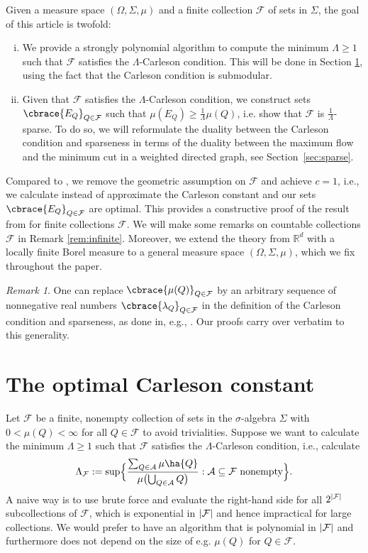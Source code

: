\documentclass[a4paper, oneside,11pt]{amsart}
\theoremstyle{definition}
\theoremstyle{remark}
\newtheorem{remark}[theorem]{Remark}
\numberwithin{equation}{section}
\newcommand{\R}{\ensuremath{\mathbb{R}}}
\newcommand{\mc}{\mathcal}
\DeclarePairedDelimiter\abs{\lvert}{\rvert}
\DeclarePairedDelimiter\cbrace\{\}
\DeclarePairedDelimiter\ha()
\newcommand{\hab}[1]{\bigl(#1\bigr)}
\newcommand{\cbraces}[1]{\Bigl\{#1\Bigr\}}
\begin{document}
\bigskip

Given a measure space $(\Omega,\Sigma,\mu)$ and a finite collection $\mc{F}$ of sets in $\Sigma$, the goal of this article is twofold:
\begin{enumerate}[(i)]
  \item \label{it:goal1}  We provide a strongly polynomial algorithm to compute the minimum $\Lambda \geq 1$ such that $\mc{F}$ satisfies the $\Lambda$-Carleson condition. This will be done in Section \ref{sec:carleson}, using the fact that the Carleson condition is submodular.
  \item Given that $\mc{F}$ satisfies the $\Lambda$-Carleson condition, we  construct sets $\cbrace{E_Q}_{Q \in \mc{F}}$ such that $\mu(E_Q) \geq \frac{1}{\Lambda} \mu(Q)$, i.e. show that $\mc{F}$ is $\frac1\Lambda$-sparse. To do so, we will reformulate the duality between the Carleson condition and sparseness in terms of the duality between the maximum flow and the minimum cut in a weighted directed graph, see Section~\ref{sec:sparse}.
\end{enumerate}
Compared to \cite{Re22}, we remove the geometric assumption on $\mc{F}$ and achieve $c=1$, i.e., we calculate instead of approximate the Carleson constant and our sets $\cbrace{E_Q}_{Q \in \mc{F}}$ are optimal. This provides a constructive proof of the result from \cite{Haen18} for finite collections $\mc{F}$. We will make some remarks on countable collections $\mc{F}$ in Remark \ref{rem:infinite}.  Moreover, we extend the theory from $\R^d$ with a locally finite Borel measure to a general measure space $(\Omega,\Sigma,\mu)$, which we fix throughout the paper.


\begin{remark}
One can replace $\cbrace{\mu(Q)}_{Q \in \mc{F}}$ by an arbitrary sequence of nonnegative real numbers  $\cbrace{\lambda_Q}_{Q \in \mc{F}}$ in the definition of the Carleson condition and  sparseness, as done in, e.g., \cite{CO17, Haen18,Ve96}. Our proofs carry over verbatim to this generality.
\end{remark}

\section{The optimal Carleson constant}\label{sec:carleson}
Let $\mc{F}$ be a finite, nonempty collection of sets in the $\sigma$-algebra $\Sigma$ with $0<\mu(Q)<\infty$ for all $Q \in \mc{F}$ to avoid trivialities. Suppose we want to calculate the minimum $\Lambda \geq 1$ such that $\mc{F}$ satisfies the $\Lambda$-Carleson condition, i.e., calculate
\begin{equation*}
  \Lambda_{\mc{F}}:= \sup\cbraces{\frac{\sum_{Q\in\mathcal{A}}\mu\ha{Q}}{\mu\hab{\textstyle\bigcup_{Q\in\mathcal{A}}Q}}
:\mc{A} \subseteq \mc{F} \text{ nonempty}}.
\end{equation*}
A naive way is to use brute force and evaluate the right-hand side for all $2^{\abs{\mc{F}}}$ subcollections of $\mc{F}$, which is exponential in $\abs{\mc{F}}$  and hence impractical for large collections. We would prefer to have an algorithm that is polynomial in $\abs{\mc{F}}$ and furthermore does not depend on the size of e.g. $\mu(Q)$ for $Q \in \mc{F}$.
\end{document}
